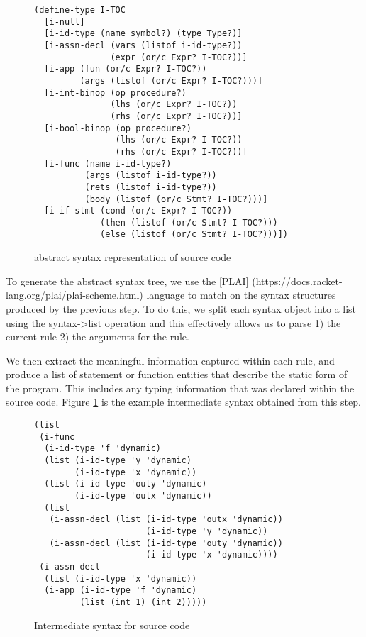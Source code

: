 \begin{figure}[h]
    \begin{lstlisting}[language=racket]
(define-type I-TOC
  [i-null]
  [i-id-type (name symbol?) (type Type?)]
  [i-assn-decl (vars (listof i-id-type?))
               (expr (or/c Expr? I-TOC?))]
  [i-app (fun (or/c Expr? I-TOC?))
         (args (listof (or/c Expr? I-TOC?)))]
  [i-int-binop (op procedure?)
               (lhs (or/c Expr? I-TOC?))
               (rhs (or/c Expr? I-TOC?))]
  [i-bool-binop (op procedure?)
                (lhs (or/c Expr? I-TOC?))
                (rhs (or/c Expr? I-TOC?))]
  [i-func (name i-id-type?)
          (args (listof i-id-type?))
          (rets (listof i-id-type?))
          (body (listof (or/c Stmt? I-TOC?)))]
  [i-if-stmt (cond (or/c Expr? I-TOC?))
             (then (listof (or/c Stmt? I-TOC?)))
             (else (listof (or/c Stmt? I-TOC?)))])
    \end{lstlisting}
    \caption[]{abstract syntax representation of source code}
\end{figure}

To generate the abstract syntax tree, we use the [PLAI] (https://docs.racket-lang.org/plai/plai-scheme.html) language to match on the syntax structures produced by the previous step. To do this, we split each syntax object into a list using the syntax->list operation and this effectively allows us to parse 1) the current rule 2) the arguments for the rule.

We then extract the meaningful information captured within each rule, and produce a list of statement or function entities that describe the static form of the program. This includes any typing information that was declared within the source code. Figure \ref{fig:intermediate} is the example intermediate syntax obtained from this step.

\begin{figure}[h]
    \begin{lstlisting}[language=racket]
(list
 (i-func
  (i-id-type 'f 'dynamic)
  (list (i-id-type 'y 'dynamic)
        (i-id-type 'x 'dynamic))
  (list (i-id-type 'outy 'dynamic)
        (i-id-type 'outx 'dynamic))
  (list
   (i-assn-decl (list (i-id-type 'outx 'dynamic))
                      (i-id-type 'y 'dynamic))
   (i-assn-decl (list (i-id-type 'outy 'dynamic))
                      (i-id-type 'x 'dynamic))))
 (i-assn-decl
  (list (i-id-type 'x 'dynamic))
  (i-app (i-id-type 'f 'dynamic)
         (list (int 1) (int 2)))))
    \end{lstlisting}
    \caption[]{Intermediate syntax for source code}
    \label{fig:intermediate}
\end{figure}

